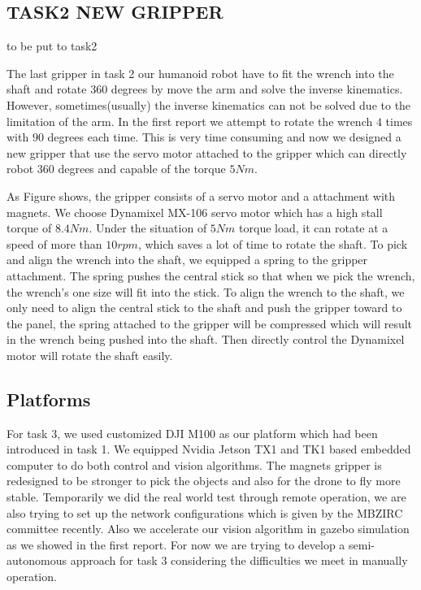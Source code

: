 \documentclass{standalone}
\begin{document}
\subsection{TASK2 NEW GRIPPER}
to be put to task2

The last gripper in task 2 our humanoid robot have to fit the wrench into the shaft and rotate $360$ degrees by move the arm and solve the inverse kinematics. However, sometimes(usually) the inverse kinematics can not be solved due to the limitation of the arm. In the first report we attempt to rotate the wrench $4$ times with $90$ degrees each time. This is very time consuming and now we designed a new gripper that use the servo motor attached to the gripper which can directly robot $360$ degrees and capable of the torque $5Nm$. 

As Figure shows, the gripper consists of a servo motor and a attachment with magnets. We choose Dynamixel MX-106 servo motor which has a high stall torque of $8.4 Nm$. Under the situation of $5 Nm$ torque load, it can rotate at a speed of more than $10 rpm$, which saves a lot of time to rotate the shaft. To pick and align the wrench into the shaft, we equipped a spring to the gripper attachment. The spring pushes the central stick so that when we pick the wrench, the wrench's one size will fit into the stick. To align the wrench to the shaft, we only need to align the central stick to the shaft and push the gripper toward to the panel, the spring attached to the gripper will be compressed which will result in the wrench being pushed into the shaft. Then directly control the Dynamixel motor will rotate the shaft easily.

\subsection{Platforms}
For task 3, we used customized DJI M100 as our platform which had been introduced in task 1. We equipped Nvidia Jetson TX1 and TK1 based embedded computer to do both control and vision algorithms. The magnets gripper is redesigned to be stronger to pick the objects and also for the drone to fly more stable. Temporarily we did the real world test through remote operation, we are also trying to set up the network configurations which is given by the MBZIRC committee recently. Also we accelerate our vision algorithm in gazebo simulation as we showed in the first report. For now we are trying to develop a semi-autonomous approach for task 3 considering the difficulties we meet in manually operation.
\end{document}
